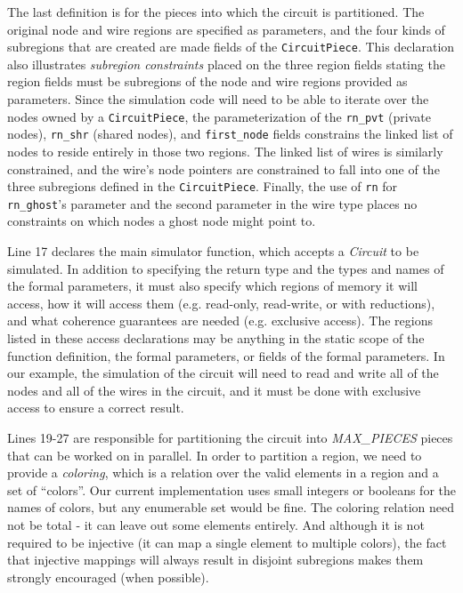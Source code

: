 The last definition is for the pieces into which the circuit is partitioned.
The original node and wire regions are specified as parameters, and the
four kinds of subregions that are created are made fields of the
{\tt CircuitPiece}.  This declaration also illustrates {\em subregion constraints}
placed on the three region fields stating the region fields  must be subregions of the 
node and wire regions provided as parameters.  Since the simulation code will need to be able to
iterate over the nodes owned by a {\tt CircuitPiece}, the parameterization of the {\tt rn\_pvt} (private nodes),
{\tt rn\_shr} (shared nodes), and {\tt first\_node} fields constrains the linked list of
nodes to reside entirely in those two regions.  The linked list of wires is
similarly constrained, and the wire's node pointers are constrained to fall
into one of the three subregions defined in the {\tt CircuitPiece}.  Finally,
the use of {\tt rn} for {\tt rn\_ghost}'s parameter and the second parameter
in the wire type places no constraints on which nodes a ghost node might point
to.

Line 17 declares the main simulator function, which accepts a \emph{Circuit}
to be simulated.  In addition to specifying the return type and the types and
names of the formal parameters, it must also specify which regions of memory
it will access, how it will access them (e.g. read-only, read-write, or with
reductions), and what coherence guarantees are needed (e.g. exclusive access).
The regions listed in these access declarations may be anything in the static
scope of the function definition, the formal parameters, or fields of the formal
parameters.  In our example, the simulation of the circuit will need to read
and write all of the nodes and all of the wires in the circuit, and it must
be done with exclusive access to ensure a correct result.

%

Lines 19-27 are responsible for partitioning the circuit into \emph{MAX\_PIECES}
pieces that can be worked on in parallel.  In order to partition a region, we
need to provide a \emph{coloring}, which is a relation over the valid elements
in a region and a set of ``colors''.  Our current implementation uses small
integers or booleans for the names of colors, but any enumerable set would be
fine.  The coloring relation need not be total - it can leave out some elements entirely.  And although it is not required to be injective (it can map a single
element to multiple colors), the fact that injective mappings will always
result in disjoint subregions makes them strongly encouraged (when possible).

